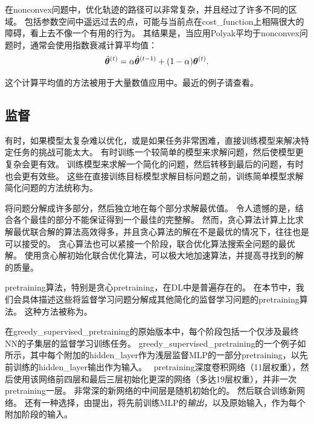 
在\gls{nonconvex}问题中，优化轨迹的路径可以非常复杂，并且经过了许多不同的区域。
包括参数空间中遥远过去的点，可能与当前点在\gls{cost_function}上相隔很大的障碍，看上去不像一个有用的行为。
其结果是，当应用Polyak平均于\gls{nonconvex}问题时，通常会使用指数衰减计算平均值：
\begin{equation}
    \hat{\boldsymbol{\theta}}^{(t)} = \alpha \hat{\boldsymbol{\theta}}^{(t-1)} + (1-\alpha) \boldsymbol{\theta}^{(t)} .
\end{equation}

这个计算平均值的方法被用于大量数值应用中。最近的例子请查看\cite{Szegedy-et-al-2015}。

\subsection{监督}
\label{sec:supervised_pretraining}
有时，如果模型太复杂难以优化，或是如果任务非常困难，直接训练模型来解决特定任务的挑战可能太大。
有时训练一个较简单的模型来求解问题，然后使模型更复杂会更有效。
训练模型来求解一个简化的问题，然后转移到最后的问题，有时也会更有效些。
这些在直接训练目标模型求解目标问题之前，训练简单模型求解简化问题的方法统称为。


将问题分解成许多部分，然后独立地在每个部分求解最优值。
令人遗憾的是，结合各个最佳的部分不能保证得到一个最佳的完整解。
然而，贪心算法计算上比求解最优联合解的算法高效得多，并且贪心算法的解在不是最优的情况下，往往也是可以接受的。
贪心算法也可以紧接一个阶段，联合优化算法搜索全问题的最优解。
使用贪心解初始化联合优化算法，可以极大地加速算法，并提高寻找到的解的质量。

\gls{pretraining}算法，特别是贪心\gls{pretraining}，在\gls{DL}中是普遍存在的。
在本节中，我们会具体描述这些将监督学习问题分解成其他简化的监督学习问题的\gls{pretraining}算法。
这种方法被称为。


在\gls{greedy_supervised_pretraining}的原始版本\citep{Bengio-nips-2006-short}中，每个阶段包括一个仅涉及最终\gls{NN}的子集层的监督学习训练任务。
\gls{greedy_supervised_pretraining}的一个例子如所示，其中每个附加的\gls{hidden_layer}作为浅层监督\gls{MLP}的一部分\gls{pretraining}，以先前训练的\gls{hidden_layer}输出作为输入。
\cite{Simonyan2015}~\gls{pretraining}深度卷积网络（11层权重），然后使用该网络前四层和最后三层初始化更深的网络（多达19层权重），并非一次\gls{pretraining}一层。
非常深的新网络的中间层是随机初始化的。
然后联合训练新网络。
还有一种选择，由\cite{Yu+al-2010}提出，将先前训练\gls{MLP}的\emph{输出}，以及原始输入，作为每个附加阶段的输入。

